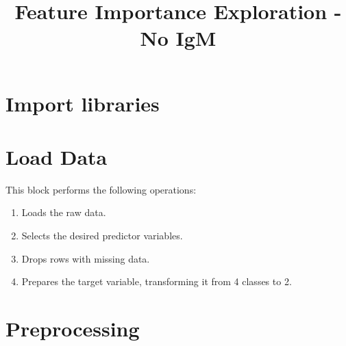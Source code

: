 \documentclass[]{article}
\title{Feature Importance Exploration - No IgM}
\author{}
\date{}
\newenvironment{Shaded}{\begin{snugshade}}{\end{snugshade}}
\newcommand{\KeywordTok}[1]{\textcolor[rgb]{0.13,0.29,0.53}{\textbf{#1}}}
\newcommand{\DataTypeTok}[1]{\textcolor[rgb]{0.13,0.29,0.53}{#1}}
\newcommand{\DecValTok}[1]{\textcolor[rgb]{0.00,0.00,0.81}{#1}}
\newcommand{\StringTok}[1]{\textcolor[rgb]{0.31,0.60,0.02}{#1}}
\newcommand{\OperatorTok}[1]{\textcolor[rgb]{0.81,0.36,0.00}{\textbf{#1}}}
\newcommand{\NormalTok}[1]{#1}
\providecommand{\tightlist}{%
  \setlength{\itemsep}{0pt}\setlength{\parskip}{0pt}}
\begin{document}
\maketitle

\section{Import libraries}\label{import-libraries}

\section{Load Data}\label{load-data}

This block performs the following operations:

\begin{enumerate}
\def\labelenumi{\arabic{enumi}.}
\tightlist
\item
  Loads the raw data.
\item
  Selects the desired predictor variables.
\item
  Drops rows with missing data.
\item
  Prepares the target variable, transforming it from 4 classes to 2.
\end{enumerate}

\begin{Shaded}
\end{Shaded}

\section{Preprocessing}\label{preprocessing}
\end{document}
